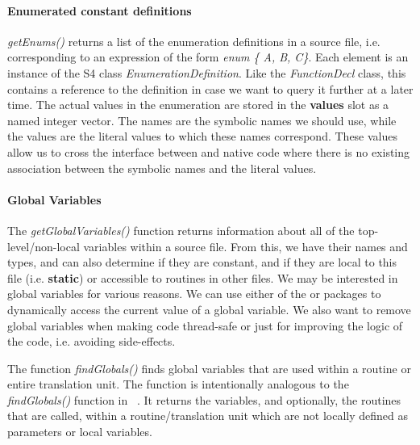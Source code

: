 \documentclass[article]{jss}
\def\R{\proglang{R}}
\def\Rpkg#1{\pkg{#1}}
\def\Rfunc#1{\textsl{#1()}}
\def\Rclass#1{\textit{#1}}
\def\Rslot#1{\textbf{#1}}
\def\Ckeyword#1{\textbf{#1}}
\def\Cexpr#1{\textsl{#1}}
\begin{document}
\paragraph{Enumerated constant definitions}
\Rfunc{getEnums} returns a list of the enumeration definitions in a
source file, i.e. corresponding to an expression of the form
\Cexpr{enum \{ A, B, C\}}. Each element is an instance of the S4 class
\Rclass{EnumerationDefinition}.  Like the \Rclass{FunctionDecl} class,
this contains a reference to the definition in case we want to query
it further at a later time.  The actual values in the enumeration are
stored in the \Rslot{values} slot as a named integer vector.  The
names are the symbolic names we should use, while the values are the
literal values to which these names correspond.  These values allow us
to cross the interface between \R{} and native code where there is no
existing association between the symbolic names and the literal values.

\paragraph{Global Variables}
The \Rfunc{getGlobalVariables} function returns information about all
of the top-level/non-local variables within a source file.  From this, we have
their names and types, and can also determine if they are constant,
and if they are local to this file (i.e. \Ckeyword{static}) or
accessible to routines in other files.  We may be interested in global
variables for various reasons.  We can use either of the
\Rpkg{rdyncall} or \Rpkg{Rffi} packages to dynamically access the
current value of a global variable.  We also want to remove global
variables when making code thread-safe or just for improving the logic
of the code, i.e. avoiding side-effects.

The function \Rfunc{findGlobals} finds global variables that are used
within a routine or entire translation unit.  The function is
intentionally analogous to the \Rfunc{findGlobals} function in
\Rpkg{codetools}~\citep{bib:codetools}. It returns the variables, and
optionally, the routines that are called, within a routine/translation
unit which are not locally defined as parameters or local variables.
\end{document}
